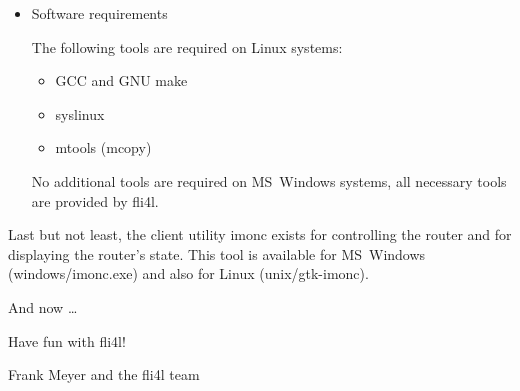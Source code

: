 \begin{itemize}
\item Software requirements

The following tools are required on Linux systems:

\begin{itemize}
\item GCC and GNU make
\item syslinux
\item mtools (mcopy)
\end{itemize}

No additional tools are required on MS~Windows systems, all necessary tools are
provided by fli4l.

\end{itemize}

Last but not least, the client utility imonc exists for controlling the router
and for displaying the router's state. This tool is available for MS~Windows
(windows/imonc.exe) and also for Linux (unix/gtk-imonc).

And now \ldots \bigskip

Have fun with fli4l!\bigskip

Frank Meyer and the fli4l team


